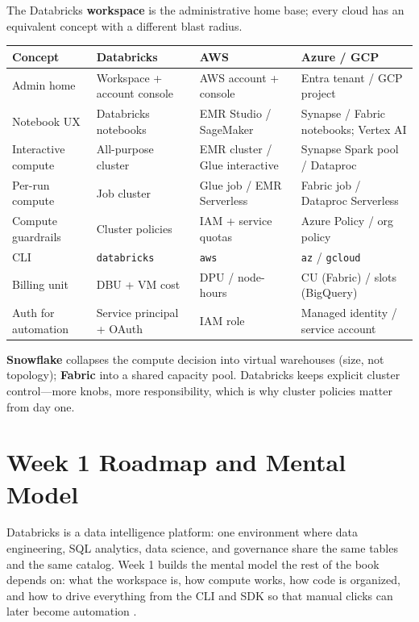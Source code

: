 \begin{crosscloud}
The Databricks \textbf{workspace} is the administrative home base; every cloud has an equivalent
concept with a different blast radius.

\vspace{2mm}
{\footnotesize
\begin{tabular}{@{}p{3.0cm}p{3.4cm}p{3.2cm}p{3.2cm}@{}}
\toprule
\textbf{Concept} & \textbf{Databricks} & \textbf{AWS} & \textbf{Azure / GCP} \\
\midrule
Admin home & Workspace + account console & AWS account + console & Entra tenant / GCP project \\
Notebook UX & Databricks notebooks & EMR Studio / SageMaker & Synapse / Fabric notebooks; Vertex AI \\
Interactive compute & All-purpose cluster & EMR cluster / Glue interactive & Synapse Spark pool / Dataproc \\
Per-run compute & Job cluster & Glue job / EMR Serverless & Fabric job / Dataproc Serverless \\
Compute guardrails & Cluster policies & IAM + service quotas & Azure Policy / org policy \\
CLI & \texttt{databricks} & \texttt{aws} & \texttt{az} / \texttt{gcloud} \\
\addlinespace
Billing unit & DBU + VM cost & DPU / node-hours & CU (Fabric) / slots (BigQuery) \\
Auth for automation & Service principal + OAuth & IAM role & Managed identity / service account \\
\bottomrule
\end{tabular}}

\vspace{1mm}
\textbf{Snowflake} collapses the compute decision into virtual warehouses (size, not topology);
\textbf{Fabric} into a shared capacity pool. Databricks keeps explicit cluster control---more knobs,
more responsibility, which is why cluster policies matter from day one.
\end{crosscloud}

\section{Week 1 Roadmap and Mental Model}
Databricks is a data intelligence platform: one environment where data engineering, SQL analytics, data science, and governance share the same tables and the same catalog. Week 1 builds the mental model the rest of the book depends on: what the workspace is, how compute works, how code is organized, and how to drive everything from the CLI and SDK so that manual clicks can later become automation \cite{databricksDocs}.

